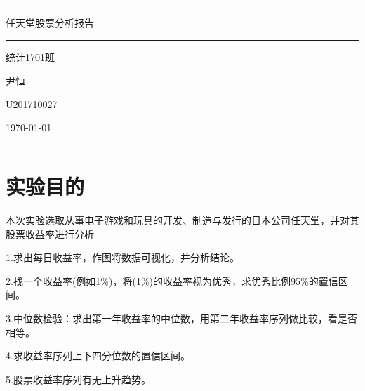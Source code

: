 \documentclass[a4paper, 11pt]{article}
\begin{document}
	\begin{titlepage}
		\centering
		\rule{\textwidth}{1pt}   %
		\vspace{0.025\textheight}  %
		
		{\Huge 任天堂股票分析报告}
		
		
		\vspace{0.025\textheight}   %
		\rule{0.83\textwidth}{0.4pt}  %
		\vspace{0.1\textheight}  %
		
		{\Large \textsc{统计1701班}}
		
		{\Large \textsc{尹恒}}
		
		{\Large \textsc{U201710027}}
		
		\vfill  %
		
		{\large \today}
		\vspace{0.1\textheight}  %
		
		
		\rule{\textwidth}{1pt}  %
	\end{titlepage}

    \tableofcontents
    
    \newpage

    \section{实验目的}
    本次实验选取从事电子游戏和玩具的开发、制造与发行的日本公司任天堂，并对其股票收益率进行分析
    
 	1.求出每日收益率，作图将数据可视化，并分析结论。
 	
 	2.找一个收益率(例如1\%)，将(1\%)的收益率视为优秀，求优秀比例95\%的置信区间。
 	
 	3.中位数检验：求出第一年收益率的中位数，用第二年收益率序列做比较，看是否相等。
 	
 	4.求收益率序列上下四分位数的置信区间。
 	
 	5.股票收益率序列有无上升趋势。
 	
\end{document}
